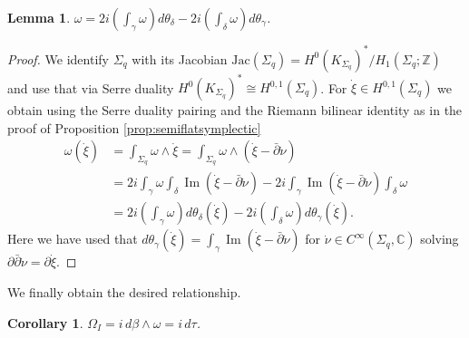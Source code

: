 \documentclass[12pt,letterpaper,reqno]{amsart}
\newtheorem{cor}[thm]{Corollary}
\newtheorem{lem}[thm]{Lemma}
\theoremstyle{remark}
\theoremstyle{definition}
\numberwithin{thm}{section}
\numberwithin{equation}{section}
\numberwithin{figure}{section}
\newcommand{\C}{\ensuremath{\mathbb C}}
\newcommand{\Z}{\ensuremath{\mathbb Z}}
\DeclareMathOperator{\im}{Im}
\begin{document}
\begin{lem}
$\omega = 2i\left( \int_\gamma \omega \right )d\theta_\delta - 2i\left( \int_\delta \omega \right)d\theta_\gamma $.
\end{lem}

\begin{proof}
We identify $\Sigma_q$ with its Jacobian $\mathrm{Jac}(\Sigma_q) = H^0(K_{\Sigma_q})^*/ H_1(\Sigma_q; \Z)$ and use that via Serre duality $H^0(K_{\Sigma_q})^* \cong H^{0,1}(\Sigma_q)$. For $\dot \xi \in H^{0,1}(\Sigma_q)$ we obtain using the Serre duality pairing and the Riemann bilinear identity as in the proof of Proposition \ref{prop:semiflatsymplectic}
\begin{align*}
\omega(\dot\xi) &= \int_{\Sigma_q} \omega \wedge \dot \xi = \int_{\Sigma_q} \omega \wedge (\dot\xi - \bar\partial\dot\nu)\\ 
&= 2i \int_\gamma\omega  \int_\delta \im ( \dot\xi - \bar\partial\dot\nu) - 2i \int_\gamma \im( \dot\xi - \bar\partial\dot\nu) \int_\delta \omega\\
&= 2i \left( \int_\gamma \omega \right )d\theta_\delta(\dot\xi) - 2i \left( \int_\delta \omega \right)d\theta_\gamma(\dot \xi).
\end{align*}
Here we have used that $d\theta_\gamma(\dot \xi) = \int_\gamma \im ( \dot\xi - \bar\partial\dot\nu)$ for $\dot \nu \in C^\infty(\Sigma_q,\C)$ solving $\partial\bar\partial \dot \nu = \partial\dot \xi$.
 \end{proof}
 
 We finally obtain the desired relationship.
 
 \begin{cor}\label{cor:primitive}
$\Omega_I =  i \,d \beta \wedge \omega =  i \,d\tau$.
 \end{cor}
\end{document}

